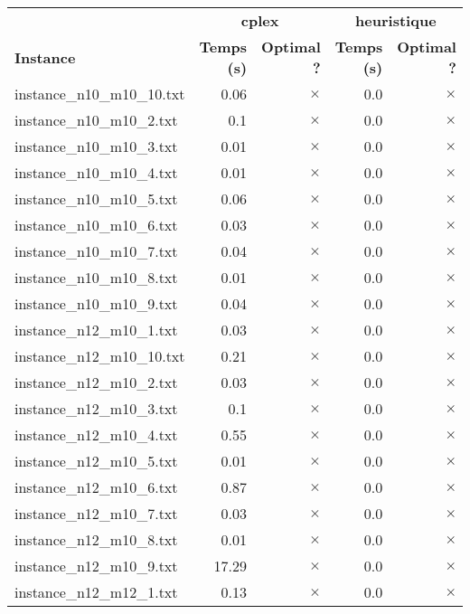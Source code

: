 \documentclass{article}
\begin{document}
\newpage
\begin{center}
\renewcommand{\arraystretch}{1.4} 
 \begin{tabular}{lrrrr}
	\hline
 & \multicolumn{2}{c}{\textbf{cplex}} & \multicolumn{2}{c}{\textbf{heuristique}}\\
\textbf{Instance}  & \textbf{Temps (s)} & \textbf{Optimal ?}  & \textbf{Temps (s)} & \textbf{Optimal ?} \\\hline

instance\_n10\_m10\_10.txt & 0.06 & 
$\times$
 & 0.0 & 
$\times$
\\
instance\_n10\_m10\_2.txt & 0.1 & 
$\times$
 & 0.0 & 
$\times$
\\
instance\_n10\_m10\_3.txt & 0.01 & 
$\times$
 & 0.0 & 
$\times$
\\
instance\_n10\_m10\_4.txt & 0.01 & 
$\times$
 & 0.0 & 
$\times$
\\
instance\_n10\_m10\_5.txt & 0.06 & 
$\times$
 & 0.0 & 
$\times$
\\
instance\_n10\_m10\_6.txt & 0.03 & 
$\times$
 & 0.0 & 
$\times$
\\
instance\_n10\_m10\_7.txt & 0.04 & 
$\times$
 & 0.0 & 
$\times$
\\
instance\_n10\_m10\_8.txt & 0.01 & 
$\times$
 & 0.0 & 
$\times$
\\
instance\_n10\_m10\_9.txt & 0.04 & 
$\times$
 & 0.0 & 
$\times$
\\
instance\_n12\_m10\_1.txt & 0.03 & 
$\times$
 & 0.0 & 
$\times$
\\
instance\_n12\_m10\_10.txt & 0.21 & 
$\times$
 & 0.0 & 
$\times$
\\
instance\_n12\_m10\_2.txt & 0.03 & 
$\times$
 & 0.0 & 
$\times$
\\
instance\_n12\_m10\_3.txt & 0.1 & 
$\times$
 & 0.0 & 
$\times$
\\
instance\_n12\_m10\_4.txt & 0.55 & 
$\times$
 & 0.0 & 
$\times$
\\
instance\_n12\_m10\_5.txt & 0.01 & 
$\times$
 & 0.0 & 
$\times$
\\
instance\_n12\_m10\_6.txt & 0.87 & 
$\times$
 & 0.0 & 
$\times$
\\
instance\_n12\_m10\_7.txt & 0.03 & 
$\times$
 & 0.0 & 
$\times$
\\
instance\_n12\_m10\_8.txt & 0.01 & 
$\times$
 & 0.0 & 
$\times$
\\
instance\_n12\_m10\_9.txt & 17.29 & 
$\times$
 & 0.0 & 
$\times$
\\
instance\_n12\_m12\_1.txt & 0.13 & 
$\times$
 & 0.0 & 
$\times$
\\

\end{tabular}
\end{center}
\end{document}
